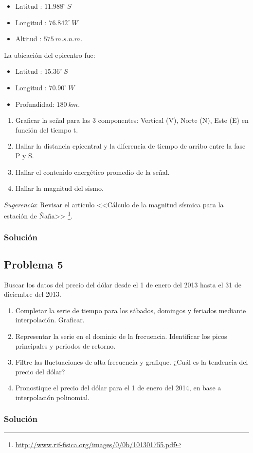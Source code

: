 \documentclass[a4paper,12pt,final]{article}
\begin{document}
      \begin{itemize}
        \item Latitud  : $11.988^\circ\ S$
        \item Longitud : $76.842^\circ\ W$
        \item Altitud  : $575\ m.s.n.m$.
      \end{itemize}

      \noindent La ubicación del epicentro fue:

      \begin{itemize}
        \item Latitud    : $15.36^\circ\ S$
        \item Longitud   : $70.90^\circ\ W$
        \item Profundidad: $180\ km$.
      \end{itemize}

      \begin{enumerate}[label=\alph*)]
        \item Graficar la señal para las 3 componentes: Vertical (V), Norte (N), Este (E) en función del tiempo t.
        \item Hallar la distancia epicentral y la diferencia de tiempo de arribo entre la fase P y S.
        \item Hallar el contenido energético promedio de la señal.
        \item Hallar la magnitud del sismo.
      \end{enumerate}

      \noindent \emph{Sugerencia}: Revisar el artículo <<Cálculo de la magnitud sísmica para la estación de Ñaña>>
      \footnote{\url{http://www.rif-fisica.org/images/0/0b/101301755.pdf}}.

    \subsubsection*{Solución}

  \newpage
  \subsection*{Problema 5}
    \noindent Buscar los datos del precio del dólar desde el 1 de enero del 2013
      hasta el 31 de diciembre del 2013.

      \begin{enumerate}[label=\alph*)]
        \item Completar la serie de tiempo para los sábados, domingos y feriados mediante interpolación. Graficar.
        \item Representar la serie en el dominio de la frecuencia. Identificar los picos principales y periodos de retorno.
        \item Filtre las fluctuaciones de alta frecuencia y grafique. ¿Cuál es la tendencia del precio del dólar?
        \item Pronostique el precio del dólar para el 1 de enero del 2014, en base a interpolación polinomial.
      \end{enumerate}

    \subsubsection*{Solución}
\end{document}

